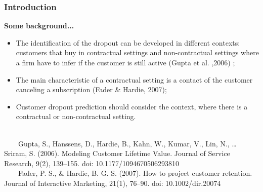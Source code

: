 \documentclass[10pt]{beamer}
\begin{document}
\begin{frame}
	\frametitle{Introduction}
	\Large
	\textbf{Some background...}\\
		\begin{itemize} \normalsize
			\item The identification of the dropout can be developed in different contexts: customers that buy in contractual settings and non-contractual settings where a firm have to infer if the customer is still active \footnotesize(Gupta et al. ,2006) \normalsize;
			\item The main characteristic of a contractual setting is a contact of the customer canceling a subscription \footnotesize(Fader \& Hardie, 2007)\normalsize;
			\item Customer dropout prediction should consider the context, where there is a contractual or non-contractual setting. \\~\\
		\end{itemize}	
	\tiny
	~~~~Gupta, S., Hanssens, D., Hardie, B., Kahn, W., Kumar, V., Lin, N., … Sriram, S. (2006). Modeling Customer Lifetime Value. Journal of Service Research, 9(2), 139–155. doi: 10.1177/1094670506293810 \\
	~~~~Fader, P. S., \& Hardie, B. G. S. (2007). How to project customer retention. Journal of Interactive Marketing, 21(1), 76–90. doi: 10.1002/dir.20074\\
\end{frame}

\end{document}
